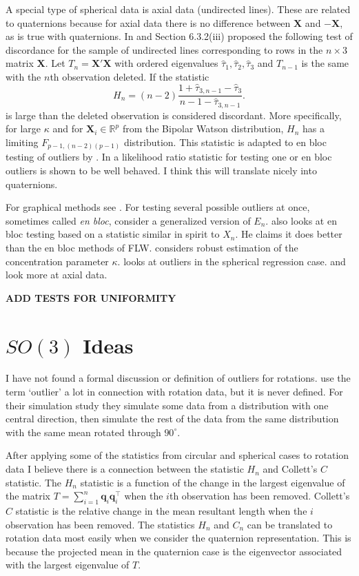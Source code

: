 \documentclass{article}\usepackage{graphicx, color}
\newcommand{\R}{{\mathbb{R}}}
\begin{document}
A special type of spherical data is axial data (undirected lines).  These are related to quaternions because for axial data there is no difference between $\bm X$ and $-\bm X$, as is true with quaternions.  In \cite{best1986} and Section 6.3.2(iii) \cite{fisher1987} proposed the following test of discordance for the sample of undirected lines corresponding to rows in the $n\times 3$ matrix $\bm X$.  Let $T_n=\bm X'\bm X$ with ordered eigenvalues $\hat\tau_1,\hat\tau_2,\hat\tau_3$ and $T_{n-1}$ is the same with the $n$th observation deleted.  If the statistic
\[
H_n=(n-2)\frac{1+\hat\tau_{3,n-1}-\hat\tau_3}{n-1-\hat\tau_{3,n-1}}.
\]
is large than the deleted observation is considered discordant.  More specifically, for large $\kappa$ and for $\bm X_i\in \R^p$ from the Bipolar Watson distribution, $H_n$ has a limiting $F_{p-1,(n-2)(p-1)}$ distribution.  This statistic is adapted to en bloc testing of outliers by \cite{figueiredo2005}.  In \cite{figueiredo2007} a likelihood ratio statistic for testing one or en bloc outliers is shown to be well behaved.  I think this will translate nicely into quaternions.




For graphical methods see \cite{lewis1982}.  For testing several possible outliers at once, sometimes called {\it en bloc}, \cite{fisher1981} consider a generalized version of $E_n$. \cite{kimber1985} also looks at en bloc testing based on a statistic similar in spirit to $X_n$.  He claims it does better than the en bloc methods of FLW.   \cite{fisher1982} considers robust estimation of the concentration parameter $\kappa$.   \cite{rivest1989} looks at outliers in the spherical regression case.   \cite{best1986} and \cite{fisher1987} look more at axial data.

{\bf ADD TESTS FOR UNIFORMITY}


\section{$SO(3)$ Ideas}

I have not found a formal discussion or definition of outliers for rotations. \cite{fletcher2008} use the term `outlier' a lot in connection with rotation data, but it is never defined.  For their simulation study they simulate some data from a distribution with one central direction, then simulate the rest of the data from the same distribution with the same mean rotated through $90^\circ$.

After applying some of the statistics from circular and spherical cases to rotation data I believe there is a connection between the statistic $H_n$ and Collett's $C$ statistic.  The $H_n$ statistic is a function of the change in the largest eigenvalue of the matrix $T=\sum_{i=1}^n\bm q_i\bm q_i^\top$ when the $i$th observation has been removed.  Collett's $C$ statistic is the relative change in the mean resultant length when the $i$ observation has been removed.   The statistics $H_n$ and $C_n$ can be translated to rotation data most easily when we consider the quaternion representation.  This is because the projected mean in the quaternion case is the eigenvector associated with the largest eigenvalue of $T$.  
\end{document}
